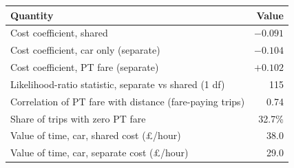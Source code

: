 \begin{tabular}{lr}
\toprule
Quantity & Value \\
\midrule
Cost coefficient, shared & $-0.091$ \\
Cost coefficient, car only (separate) & $-0.104$ \\
Cost coefficient, PT fare (separate) & $+0.102$ \\
Likelihood-ratio statistic, separate vs shared (1 df) & 115 \\
Correlation of PT fare with distance (fare-paying trips) & 0.74 \\
Share of trips with zero PT fare & 32.7\% \\
Value of time, car, shared cost (\pounds/hour) & 38.0 \\
Value of time, car, separate cost (\pounds/hour) & 29.0 \\
\bottomrule
\end{tabular}
